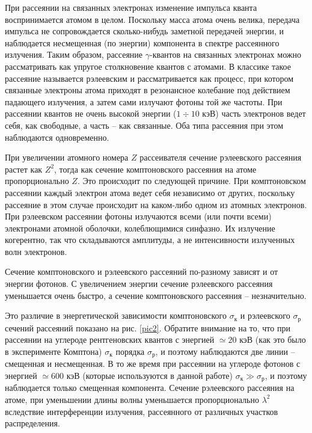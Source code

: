 \documentclass[a4paper, 12pt]{article}
\begin{document}
При рассеянии на связанных электронах изменение импульса кванта воспринимается атомом в целом. Поскольку масса атома очень велика, передача импульса не сопровождается сколько-нибудь заметной передачей энергии, и наблюдается несмещенная (по энергии) компонента в спектре рассеянного излучения. Таким образом, рассеяние $\gamma$-квантов на связанных электронах можно рассматривать как упругое столкновение квантов с атомами. В классике такое рассеяние называется рэлеевским и рассматривается как процесс, при котором связанные электроны атома приходят в резонансное колебание под действием падающего излучения, а затем сами излучают фотоны той же частоты. При рассеянии квантов не очень высокой энергии ($1\div 10$ кэВ) часть электронов ведет себя, как свободные, а часть -- как связанные. Оба типа рассеяния при этом наблюдаются одновременно.\par
При увеличении атомного номера $Z$ рассеивателя сечение рэлеевского рассеяния растет как $Z^2$, тогда как сечение комптоновского рассеяния на атоме пропорционально $Z$. Это происходит по следующей причине. При комптоновском рассеянии каждый электрон атома ведет себя независимо от других, поскольку рассеяние в этом случае происходит на каком-либо одном из атомных электронов. При рэлеевском рассеянии фотоны излучаются всеми (или почти всеми) электронами атомной оболочки, колеблющимися синфазно. Их излучение когерентно, так что складываются амплитуды, а не интенсивности излученных волн электронов.\par
Сечение комптоновского и рэлеевского рассеяний по-разному зависят и от энергии фотонов. С увеличением энергии сечение рэлеевского рассеяния уменьшается очень быстро, а сечение комптоновского рассеяния -- незначительно.\par
Это различие в энергетической зависимости комптоновского $\sigma_{\text{к}}$ и рэлеевского $\sigma_{\text{р}}$ сечений рассеяний показано на рис. \ref{pic2}. Обратите внимание на то, что при рассеянии на углероде рентгеновских квантов с энергией $\simeq 20$ кэВ (как это было в эксперименте Комптона) $\sigma_{\text{к}}$ порядка $\sigma_{\text{р}}$, и поэтому наблюдаются две линии -- смещенная и несмещенная. В то же время при рассеянии на углероде фотонов с энергией $\simeq 600$ кэВ (которые используются в данной работе) $\sigma_{\text{к}} \gg \sigma_{\text{р}}$, и поэтому наблюдается только смещенная компонента. Сечение рэлеевского рассеяния на атоме, при уменьшении длины волны уменьшается пропорционально $\lambda^2$ вследствие интерференции излучения, рассеянного от различных участков распределения.\par
\end{document}
